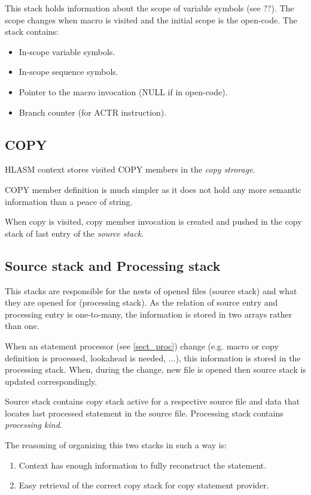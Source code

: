 This stack holds information about the scope of variable symbols (see ??). The scope changes when macro is visited and the initial scope is the open-code. 
The stack contains:
\begin{itemize}
	\item In-scope variable symbols.
	\item In-scope sequence symbols.
	\item Pointer to the macro invocation (NULL if in open-code).
	\item Branch counter (for ACTR instruction).
\end{itemize}

\subsection{COPY}

HLASM context stores visited COPY members in the \emph{copy strorage}.

COPY member definition is much simpler as it does not hold any more semantic information than a peace of string.

When copy is visited, copy member invocation is created and pushed in the copy stack of last entry of the \emph{source stack}.

\subsection{Source stack and Processing stack}

This stacks are responsible for the nests of opened files (source stack) and what they are opened for (processing stack). As the relation of source entry and processing entry is one-to-many, the information is stored in two arrays rather than one.

When an statement processor (see \cref{sect_proc}) change (e.g. macro or copy definition is processed, lookahead is needed, ...), this information is stored in the processing stack. When, during the change, new file is opened then source stack is updated correspondingly.

Source stack contains copy stack active for a respective source file and data that locates last processed statement in the source file.
Processing stack contains \emph{processing kind}.

The reasoning of organizing this two stacks in such a way is:
\begin{enumerate}
	\item Context has enough information to fully reconstruct the statement.
	\item Easy retrieval of the correct copy stack for copy statement provider.
\end{enumerate} 

